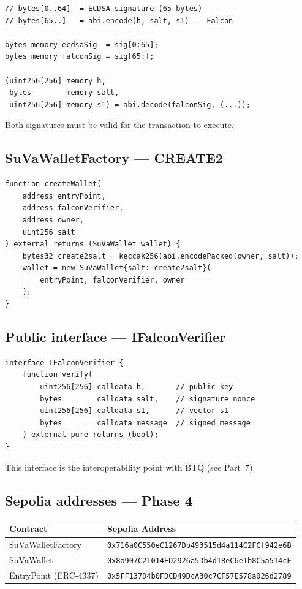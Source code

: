 \documentclass[11pt,a4paper]{article}
\begin{document}
\begin{lstlisting}[style=solidity, caption={UserOperation signature layout}]
// bytes[0..64]  = ECDSA signature (65 bytes)
// bytes[65..]   = abi.encode(h, salt, s1) -- Falcon

bytes memory ecdsaSig  = sig[0:65];
bytes memory falconSig = sig[65:];

(uint256[256] memory h,
 bytes        memory salt,
 uint256[256] memory s1) = abi.decode(falconSig, (...));
\end{lstlisting}

Both signatures must be valid for the transaction to execute.

\subsection{SuVaWalletFactory --- CREATE2}

\begin{lstlisting}[style=solidity]
function createWallet(
    address entryPoint,
    address falconVerifier,
    address owner,
    uint256 salt
) external returns (SuVaWallet wallet) {
    bytes32 create2salt = keccak256(abi.encodePacked(owner, salt));
    wallet = new SuVaWallet{salt: create2salt}(
        entryPoint, falconVerifier, owner
    );
}
\end{lstlisting}

\subsection{Public interface --- IFalconVerifier}

\begin{lstlisting}[style=solidity, caption={Shared interface for interoperability}]
interface IFalconVerifier {
    function verify(
        uint256[256] calldata h,       // public key
        bytes        calldata salt,    // signature nonce
        uint256[256] calldata s1,      // vector s1
        bytes        calldata message  // signed message
    ) external pure returns (bool);
}
\end{lstlisting}

This interface is the interoperability point with BTQ (see Part~7).

\subsection{Sepolia addresses --- Phase 4}

\begin{center}
\begin{tabular}{ll}
\toprule
\textbf{Contract} & \textbf{Sepolia Address} \\
\midrule
SuVaWalletFactory & \texttt{0x716a0C550eC1267Db493515d4a114C2FCf942e6B} \\
SuVaWallet & \texttt{0x8a907C21014ED2926a53b4d18eC6e1b8C5a514cE} \\
EntryPoint (ERC-4337) & \texttt{0x5FF137D4b0FDCD49DcA30c7CF57E578a026d2789} \\
\bottomrule
\end{tabular}
\end{center}
\end{document}
